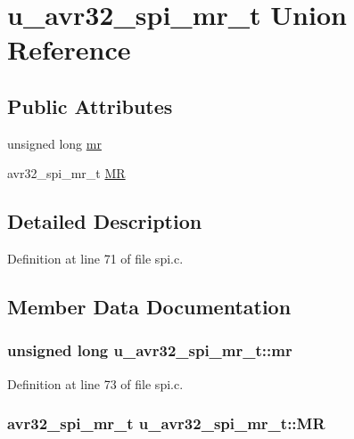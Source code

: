 \hypertarget{unionu__avr32__spi__mr__t}{}\section{u\+\_\+avr32\+\_\+spi\+\_\+mr\+\_\+t Union Reference}
\label{unionu__avr32__spi__mr__t}
\subsection*{Public Attributes}
\begin{DoxyCompactItemize}
\item 
unsigned long \hyperlink{unionu__avr32__spi__mr__t_a41d02dda543e9815d378a405aa5410ec}{mr}
\item 
avr32\+\_\+spi\+\_\+mr\+\_\+t \hyperlink{unionu__avr32__spi__mr__t_ad47c020f6ca59919bf2571ec941db436}{M\+R}
\end{DoxyCompactItemize}


\subsection{Detailed Description}


Definition at line 71 of file spi.\+c.



\subsection{Member Data Documentation}
\hypertarget{unionu__avr32__spi__mr__t_a41d02dda543e9815d378a405aa5410ec}{}
\subsubsection[{mr}]{\setlength{\rightskip}{0pt plus 5cm}unsigned long u\+\_\+avr32\+\_\+spi\+\_\+mr\+\_\+t\+::mr}\label{unionu__avr32__spi__mr__t_a41d02dda543e9815d378a405aa5410ec}


Definition at line 73 of file spi.\+c.

\hypertarget{unionu__avr32__spi__mr__t_ad47c020f6ca59919bf2571ec941db436}{}
\subsubsection[{M\+R}]{\setlength{\rightskip}{0pt plus 5cm}avr32\+\_\+spi\+\_\+mr\+\_\+t u\+\_\+avr32\+\_\+spi\+\_\+mr\+\_\+t\+::\+M\+R}\label{unionu__avr32__spi__mr__t_ad47c020f6ca59919bf2571ec941db436}


